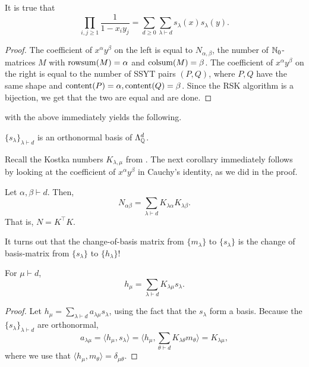 	\begin{fcor}
		It is true that
		\[ \prod_{i,j \ge 1} \frac{1}{1-x_iy_j} = \sum_{d \ge 0} \sum_{\lambda \vdash d} s_\lambda(x) s_\lambda(y). \]
	\end{fcor}

	\begin{proof}
		The coefficient of $x^\alpha y^\beta$ on the left is equal to $N_{\alpha,\beta}$, the number of $\mathbb{N}_0$-matrices $M$ with $\operatorname{rowsum}(M) = \alpha$ and $\operatorname{colsum}(M) = \beta$.  The coefficient of $x^\alpha y^\beta$ on the right is equal to the number of SSYT pairs $(P,Q)$, where $P,Q$ have the same shape and $\operatorname{content}(P) = \alpha, \operatorname{content}(Q) = \beta$. Since the RSK algorithm is a bijection, we get that the two are equal and are done.
	\end{proof}

	 with the above immediately yields the following.

	\begin{fcor}
		$\{s_\lambda\}_{\lambda \vdash d}$ is an orthonormal basis of $\Lambda^d_{\mathbb{Q}}$.
	\end{fcor}

	Recall the Kostka numbers $K_{\lambda,\mu}$ from . The next corollary immediately follows by looking at the coefficient of $x^\alpha y^\beta$ in Cauchy's identity, as we did in the proof.

	\begin{fcor}
		Let $\alpha,\beta \vdash d$. Then,
		\[ N_{\alpha\beta} = \sum_{\lambda \vdash d} K_{\lambda\alpha} K_{\lambda \beta}. \]
		That is, $N = K^\top K$.
	\end{fcor}

	It turns out that the change-of-basis matrix from $\{m_\lambda\}$ to $\{s_\lambda\}$ is the change of basis-matrix from $\{s_\lambda\}$ to $\{h_\lambda\}$!

	\begin{fcor}
		For $\mu \vdash d$,
		\[ h_\mu = \sum_{\lambda \vdash d} K_{\lambda\mu} s_\lambda. \]
	\end{fcor}
	\begin{proof}
		Let $h_\mu = \sum_{\lambda \vdash d} a_{\lambda\mu} s_\lambda$, using the fact that the $s_\lambda$ form a basis. Because the $\{s_\lambda\}_{\lambda \vdash d}$ are orthonormal,
		\[ a_{\lambda\mu} = \langle h_\mu , s_\lambda \rangle = \langle  h_\mu , \sum_{\theta \vdash d} K_{\lambda\theta} m_\theta \rangle = K_{\lambda\mu}, \]
		where we use that $\langle h_\mu,m_\theta\rangle = \delta_{\mu\theta}$.
	\end{proof}

